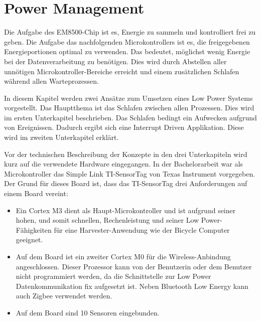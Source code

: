 
\section{Power Management}\label{t_power_management} 

Die Aufgabe des EM8500-Chip ist es, Energie zu sammeln und kontrolliert frei zu geben. Die Aufgabe das nachfolgenden Microkontrollers ist es, die freigegebenen Energieportionen optimal zu verwenden. Das bedeutet, möglichst wenig Energie bei der Datenverarbeitung zu benötigen. Dies wird durch Abstellen aller unnötigen Microkontroller-Bereiche erreicht und einem zusätzlichen Schlafen während allen Warteprozessen.

In diesem Kapitel werden zwei Ansätze zum Umsetzen eines Low Power Systems vorgestellt. Das Hauptthema ist das Schlafen zwischen allen Prozessen. Dies wird im ersten Unterkapitel beschrieben. Das Schlafen bedingt ein Aufwecken aufgrund von Ereignissen. Dadurch ergibt sich eine Interrupt Driven Applikation. Diese wird im zweiten Unterkapitel erklärt. %

Vor der technischen Beschreibung der Konzepte in den drei Unterkapiteln wird kurz auf die verwendete Hardware eingegangen. In der Bachelorarbeit war als Microkontroller das Simple Link TI-SensorTag von Texas Instrument vorgegeben. Der Grund für dieses Board ist, dass das TI-SensorTag drei Anforderungen auf einem Board vereint:

\begin{minipage}{1\textwidth}
    \begin{itemize}
        \item Ein Cortex M3 dient als Haupt-Microkontroller und ist aufgrund seiner hohen, und somit schnellen, Rechenleistung und seiner Low Power-Fähigkeiten für eine Harvester-Anwendung wie der Bicycle Computer geeignet.
        \item Auf dem Board ist ein zweiter Cortex M0 für die Wireless-Anbindung angeschlossen. Dieser Prozessor kann von der Benutzerin oder dem Benutzer nicht programmiert werden, da die Schnittstelle zur Low Power Datenkommunikation fix aufgesetzt ist. Neben Bluetooth Low Energy kann auch Zigbee verwendet werden.
        \item Auf dem Board sind 10 Sensoren eingebunden.
    \end{itemize}
\end{minipage}


